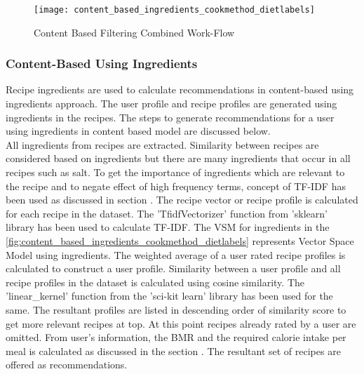 \begin{singlespace}
\begin{figure}[H]
	\centering
	\texttt{[image: content\_based\_ingredients\_cookmethod\_dietlabels]}
	\caption{Content Based Filtering Combined Work-Flow }
	\label{fig:content_based_ingredients_cookmethod_dietlabels}
\end{figure}  
\end{singlespace}


\subsubsection{Content-Based Using Ingredients}
\label{sec:cb_ingredients}
Recipe ingredients are used to calculate recommendations in content-based using ingredients approach. The user profile and recipe profiles are generated using ingredients in the recipes. The steps to generate recommendations for a user using ingredients in content based model are discussed below.\\
All ingredients from recipes are extracted. Similarity between recipes are considered based on ingredients but there are many ingredients that occur in all recipes such as salt. To get the importance of ingredients which are relevant to the recipe and to negate effect of high frequency terms, concept of TF-IDF has been used as discussed in section . The recipe vector or recipe profile is calculated for each recipe in the dataset. The 'TfidfVectorizer' function from 'sklearn' library has been used to calculate TF-IDF. The VSM for ingredients in the \autoref{fig:content_based_ingredients_cookmethod_dietlabels} represents Vector Space Model using ingredients. The weighted average of a user rated recipe profiles is calculated to construct a user profile. Similarity between a user profile and all recipe profiles in the dataset is calculated using cosine similarity. The 'linear\_kernel' function from the 'sci-kit learn' library has been used for the same. The resultant profiles are listed in descending order of similarity score to get more relevant recipes at top. At this point recipes already rated by a user are omitted. From user's information, the BMR and the required calorie intake per meal is calculated as discussed in the section . The resultant set of recipes are offered as recommendations. 

